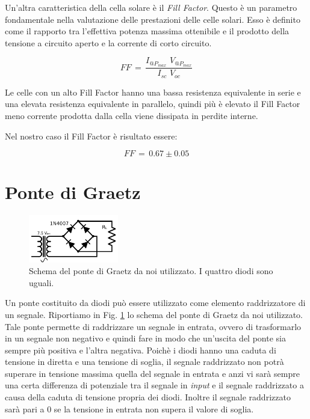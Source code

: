 Un'altra caratteristica della cella solare è il \emph{Fill Factor}. Questo è un parametro fondamentale nella valutazione delle prestazioni delle celle solari. Esso è definito come il rapporto tra l'effettiva potenza massima ottenibile e il prodotto della tensione a circuito aperto e la corrente di corto circuito.

\begin{equation}
FF \, = \, \frac{I_{@P_{max}} \,\, V_{@P_{max}}}{I_{sc} \,\, V_{oc}}
\label{eq:FF}
\end{equation}

Le celle con un alto Fill Factor hanno una bassa resistenza equivalente in serie e una elevata resistenza equivalente in parallelo, quindi più è elevato il Fill Factor meno corrente prodotta dalla cella viene dissipata in perdite interne.

Nel nostro caso il Fill Factor è risultato essere:

$$FF \,=\, 0.67 \pm 0.05$$


\section{Ponte di Graetz}

\begin{figure}
	\includegraphics[width=0.35\textwidth]{schema_graetz.pdf}
	\caption{Schema del ponte di Graetz da noi utilizzato. I quattro diodi sono uguali.}
	\label{fig:graetz}
\end{figure}

Un ponte costituito da diodi può essere utilizzato come elemento raddrizzatore di un segnale. Riportiamo in Fig. \ref{fig:graetz} lo schema del ponte di Graetz da noi utilizzato. Tale ponte permette di raddrizzare un segnale in entrata, ovvero di trasformarlo in un segnale non negativo e quindi fare in modo che un'uscita del ponte sia sempre più positiva e l'altra negativa. Poichè i diodi hanno una caduta di tensione in diretta e una tensione di soglia, il segnale raddrizzato non potrà superare in tensione massima quella del segnale in entrata e anzi vi sarà sempre una certa differenza di potenziale tra il segnale in \emph{input} e il segnale raddrizzato a causa della caduta di tensione propria dei diodi.
Inoltre il segnale raddrizzato sarà pari a 0 se la tensione in entrata non supera il valore di soglia.

